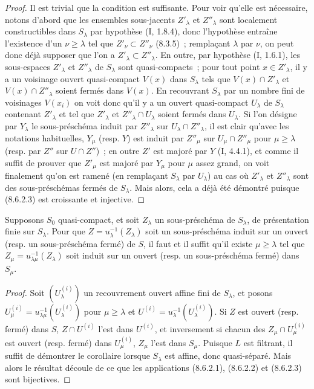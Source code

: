 \begin{proof}
Il est trivial que la condition est suffisante. Pour voir qu'elle est
nécessaire, notons d'abord que les ensembles sous-jacents $Z'_\lambda$ et
$Z''_\lambda$ sont localement constructibles dans $S_\lambda$ par hypothèse
(I, 1.8.4), donc l'hypothèse entraîne l'existence d'un $\nu\geq\lambda$ tel
que $Z'_\nu\subset Z''_\nu$ (8.3.5)~; remplaçant $\lambda$ par $\nu$, on peut
donc déjà supposer que l'on a $Z'_\lambda\subset Z''_\lambda$. En outre, par
hypothèse (I, 1.6.1), les sous-espaces $Z'_\lambda$ et $Z''_\lambda$ de
$S_\lambda$ sont quasi-compacts~; pour tout point $x\in Z'_\lambda$, il y a un
voisinage ouvert quasi-compact $V(x)$ dans $S_\lambda$ tels que
$V(x)\cap Z'_\lambda$ et $V(x)\cap Z''_\lambda$ soient fermés dans $V(x)$. En
recouvrant $S_\lambda$ par un nombre fini de voisinages $V(x_i)$ on voit donc
qu'il y a un ouvert quasi-compact $U_\lambda$ de $S_\lambda$ contenant
$Z'_\lambda$ et tel que $Z'_\lambda$ et $Z''_\lambda\cap U_\lambda$ soient
fermés dans $U_\lambda$. Si l'on désigne par $Y_\lambda$ le sous-préschéma
induit par $Z''_\lambda$ sur $U_\lambda\cap Z''_\lambda$, il est clair qu'avec
les notations habituelles, $Y_\mu$ (resp. $Y$) est induit par $Z''_\mu$ sur
$U_\mu\cap Z''_\mu$ pour $\mu\geq\lambda$ (resp. par $Z''$ sur
$U\cap Z''$)~; en outre $Z'$ est majoré par $Y$ (I, 4.4.1), et comme il suffit
de prouver que $Z'_\mu$ est majoré par $Y_\mu$ pour $\mu$
assez grand, on voit finalement qu'on est ramené (en remplaçant $S_\lambda$
par $U_\lambda$) au cas où $Z'_\lambda$ et $Z''_\lambda$ sont des
sous-préschémas fermés de $S_\lambda$. Mais alors, cela a déjà été démontré
puisque (8.6.2.3) est croissante et injective.
\end{proof}

\begin{corollary}[8.6.4]
\label{IV.8.6.4-fr}
Supposons $S_0$ quasi-compact, et soit $Z_\lambda$ un sous-préschéma de
$S_\lambda$, de présentation finie sur $S_\lambda$. Pour que
$Z=u_\lambda^{-1}(Z_\lambda)$ soit un sous-préschéma induit sur un ouvert
(resp. un sous-préschéma fermé) de $S$, il faut et il suffit qu'il existe
$\mu\geq\lambda$ tel que $Z_\mu=u_{\lambda\mu}^{-1}(Z_\lambda)$ soit induit
sur un ouvert (resp. un sous-préschéma fermé) dans $S_\mu$.
\end{corollary}

\begin{proof}
Soit $(U_\lambda^{(i)})$ un recouvrement ouvert affine fini de $S_\lambda$, et
posons $U_\mu^{(i)}=u_{\lambda\mu}^{-1}(U_\lambda^{(i)})$ pour
$\mu\geq\lambda$ et $U^{(i)}=u_\lambda^{-1}(U_\lambda^{(i)})$. Si $Z$ est
ouvert (resp. fermé) dans $S$, $Z\cap U^{(i)}$ l'est dans $U^{(i)}$, et
inversement si chacun des $Z_\mu\cap U_\mu^{(i)}$ est ouvert (resp. fermé)
dans $U_\mu^{(i)}$, $Z_\mu$ l'est dans $S_\mu$. Puisque $L$ est filtrant, il
suffit de démontrer le corollaire lorsque $S_\lambda$ est affine, donc
quasi-séparé. Mais alors le résultat découle de ce que les applications
(8.6.2.1), (8.6.2.2) et (8.6.2.3) sont bijectives.
\end{proof}


